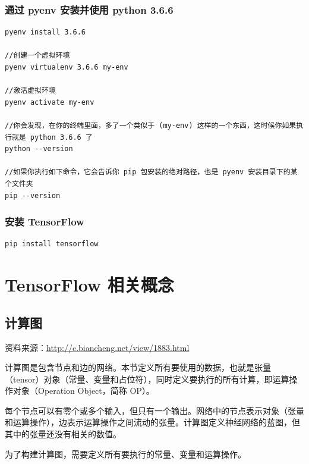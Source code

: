 \documentclass[12pt]{article}
\begin{document}
\subsubsection{通过 pyenv 安装并使用 python 3.6.6}

\begin{lstlisting}
pyenv install 3.6.6

//创建一个虚拟环境
pyenv virtualenv 3.6.6 my-env

//激活虚拟环境
pyenv activate my-env

//你会发现，在你的终端里面，多了一个类似于 (my-env) 这样的一个东西，这时候你如果执行就是 python 3.6.6 了
python --version

//如果你执行如下命令，它会告诉你 pip 包安装的绝对路径，也是 pyenv 安装目录下的某个文件夹
pip --version
\end{lstlisting}

\subsubsection{安装 TensorFlow}
\begin{lstlisting}
pip install tensorflow
\end{lstlisting}

\section{TensorFlow 相关概念}
\subsection{计算图}
资料来源：\url{http://c.biancheng.net/view/1883.html}

计算图是包含节点和边的网络。本节定义所有要使用的数据，也就是张量（tensor）对象（常量、变量和占位符），同时定义要执行的所有计算，即运算操作对象（Operation Object，简称 OP）。

每个节点可以有零个或多个输入，但只有一个输出。网络中的节点表示对象（张量和运算操作），边表示运算操作之间流动的张量。计算图定义神经网络的蓝图，但其中的张量还没有相关的数值。

为了构建计算图，需要定义所有要执行的常量、变量和运算操作。
\end{document}
